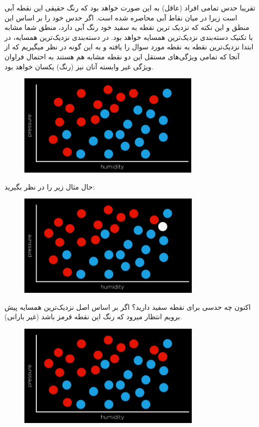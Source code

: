\documentclass[a4paper, titlepage]{article}
\begin{document}
تقریبا حدس تمامی افراد (عاقل) به این صورت خواهد بود که رنگ حقیقی این نقطه آبی است زیرا در میان نقاط آبی محاصره شده است. اگر حدس خود را بر اساس این منطق و این نکته که نزدیک ترین نقطه به سفید خود رنگ آبی دارد، منطق شما مشابه با تکنیک دسته‌بندی نزدیک‌ترین همسایه خواهد بود. در دسته‌بندی نزدیک‌ترین همسایه، در ابتدا نزدیک‌ترین نقطه به نقطه مورد سوال را یافته و به این گونه در نظر میگیریم که از آنجا که تمامی ویژگی‌های مستقل این دو نقطه مشابه هم هستند به احتمال فراوان ویژگی غیر وابسته آنان نیز (رنگ) یکسان خواهد بود.

\begin{figure}[H]
    \center
    \includegraphics[height=5cm]{Classification-img12.png}
    \label{Classification-img12}
    \caption{}
\end{figure}

حال مثال زیر را در نظر بگیرید:

\begin{figure}[H]
    \center
    \includegraphics[height=5cm]{Classification-img13.png}
    \label{Classification-img13}
    \caption{}
\end{figure}

اکنون چه حدسی برای نقطه سفید دارید؟ اگر بر اساس اصل نزدیک‌ترین همسایه پیش برویم انتظار میرود که رنگ این نقطه قرمز باشد (غیر بارانی).

\begin{figure}[H]
    \center
    \includegraphics[height=5cm]{Classification-img14.png}
    \label{Classification-img14}
    \caption{}
\end{figure}
\end{document}
